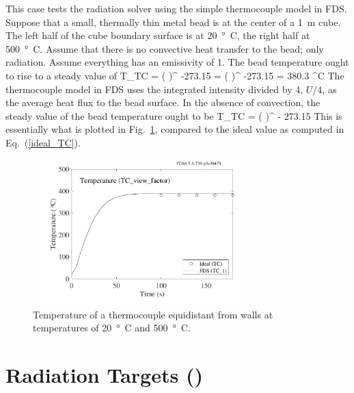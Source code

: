 \documentclass[11pt]{book}
\begin{document}
This case tests the radiation solver using the simple thermocouple model in FDS.  Suppose that a small, thermally thin metal bead is at the center of a 1~m cube. The left half of the cube boundary surface is at 20~\si{\degree C}, the right half at 500~\si{\degree C}. Assume that there is no convective heat transfer to the bead; only radiation. Assume everything has an emissivity of 1. The bead temperature ought to rise to a steady value of
\be
   T_{\hbox{\tiny TC}} = \left(  \right)^ -273.15 = \left(  \right)^ -273.15 = 380.3 \quad ^\circ \hbox{C}
   \label{ideal_TC}
\ee
The thermocouple model in FDS uses the integrated intensity divided by 4, $U/4$, as the average heat flux to the bead surface. In the absence of convection, the steady value of the bead temperature ought to be
\be
   T_{\hbox{\tiny TC}} = \left(  \right)^ - 273.15
\ee
This is essentially what is plotted in Fig.~\ref{TC_view_factor_plot}, compared to the ideal value as computed in Eq.~(\ref{ideal_TC}).
\begin{figure}[ht]
\centering
\includegraphics[width=3.2in]{SCRIPT_FIGURES/TC_view_factor}
\caption[Radiation/thermocouple test case]{Temperature of a thermocouple equidistant from walls at temperatures of 20~\si{\degree C} and 500~\si{\degree C}.}
\label{TC_view_factor_plot}
\end{figure}



\section{Radiation Targets (\texorpdfstring{}{target\_test}) }
\label{target_test}
\end{document}
